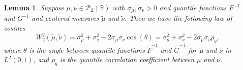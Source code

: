 \documentclass{amsart}
\numberwithin{equation}{section}
\theoremstyle{plain}
\newtheorem{lemma}[subsection]{Lemma}
\theoremstyle{definition}
\begin{document}
\begin{lemma}\label{WTaylorDiagram}
Suppose $\mu, \nu \in \mathcal{P}_2(\mathbb{R})$ with $\sigma_\mu,\sigma_\nu>0$ and quantile functions $ F^{-1}$ and $G^{-1}$ and centered measures $\widetilde{\mu} $ and $ \widetilde{\nu}$. Then we have the following law of cosines 
\begin{equation}\label{eqn:WTaylorDiagram}
    W_2^2(\widetilde{\mu}, \widetilde{\nu})  = \sigma_\mu^2 + \sigma_\nu^2 -2 \sigma_\mu \sigma_\nu \cos(\theta) = \sigma_\mu^2 + \sigma_\nu^2 -2 \sigma_\mu \sigma_\nu \rho_q ,
\end{equation}
where $\theta$ is the angle between quantile functions $\widetilde{F}^{-1}$ and $\widetilde{G}^{-1}$ for $\widetilde{\mu}$ and $ \widetilde{\nu}$  in $L^2(0,1)$, and $\rho_q$ is the quantile correlation coefficient between $\mu$ and $\nu$. 
\end{lemma}
\end{document}
